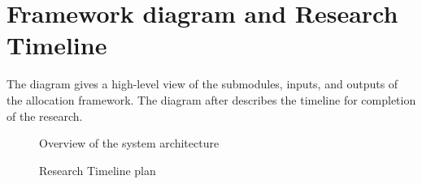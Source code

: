 \section{Framework diagram and Research Timeline}

The diagram gives a high-level view of the submodules, inputs, and outputs of the allocation framework. The diagram after describes the timeline for completion of the research.

\begin{figure}
    \centering
    \caption{Overview of the system architecture}
    \label{fig:system_architecture}
\end{figure}

\begin{figure}
    \centering
    \caption{Research Timeline plan}
    \label{fig:gantt_chart}
\end{figure}

